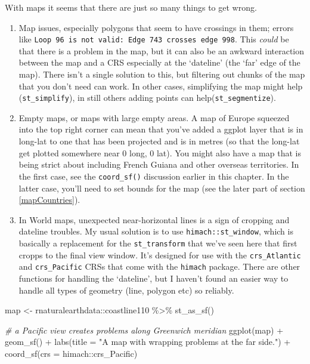 \documentclass[
]{book}
\newenvironment{Shaded}{\begin{snugshade}}{\end{snugshade}}
\newcommand{\AttributeTok}[1]{\textcolor[rgb]{0.77,0.63,0.00}{#1}}
\newcommand{\CommentTok}[1]{\textcolor[rgb]{0.56,0.35,0.01}{\textit{#1}}}
\newcommand{\FunctionTok}[1]{\textcolor[rgb]{0.00,0.00,0.00}{#1}}
\newcommand{\NormalTok}[1]{#1}
\newcommand{\OtherTok}[1]{\textcolor[rgb]{0.56,0.35,0.01}{#1}}
\newcommand{\SpecialCharTok}[1]{\textcolor[rgb]{0.00,0.00,0.00}{#1}}
\newcommand{\StringTok}[1]{\textcolor[rgb]{0.31,0.60,0.02}{#1}}
\providecommand{\tightlist}{%
  \setlength{\itemsep}{0pt}\setlength{\parskip}{0pt}}
\begin{document}
With maps it seems that there are just so many things to get wrong.

\begin{enumerate}
\def\labelenumi{\arabic{enumi})}
\tightlist
\item
  Map issues, especially polygons that seem to have crossings in them; errors like \texttt{Loop\ 96\ is\ not\ valid:\ Edge\ 743\ crosses\ edge\ 998}. This \emph{could} be that there is a problem in the map, but it can also be an awkward interaction between the map and a CRS especially at the `dateline' (the `far' edge of the map). There isn't a single solution to this, but filtering out chunks of the map that you don't need can work. In other cases, simplifying the map might help (\texttt{st\_simplify}), in still others adding points can help(\texttt{st\_segmentize}).
\item
  Empty maps, or maps with large empty areas. A map of Europe squeezed into the top right corner can mean that you've added a ggplot layer that is in long-lat to one that has been projected and is in metres (so that the long-lat get plotted somewhere near 0 long, 0 lat). You might also have a map that is being strict about including French Guiana and other overseas territories. In the first case, see the \texttt{coord\_sf()} discussion earlier in this chapter. In the latter case, you'll need to set bounds for the map (see the later part of section \ref{mapCountries}).
\item
  In World maps, unexpected near-horizontal lines is a sign of cropping and dateline troubles. My usual solution is to use \texttt{himach::st\_window}, which is basically a replacement for the \texttt{st\_transform} that we've seen here that first cropps to the final view window. It's designed for use with the \texttt{crs\_Atlantic} and \texttt{crs\_Pacific} CRSs that come with the \texttt{himach} package. There are other functions for handling the `dateline', but I haven't found an easier way to handle all types of geometry (line, polygon etc) so reliably.
\end{enumerate}

\begin{Shaded}
\begin{Highlighting}[]
\NormalTok{map }\OtherTok{\textless{}{-}}\NormalTok{ rnaturalearthdata}\SpecialCharTok{::}\NormalTok{coastline110 }\SpecialCharTok{\%\textgreater{}\%} 
  \FunctionTok{st\_as\_sf}\NormalTok{()}

\CommentTok{\# a Pacific view creates problems along Greenwich meridian}
\FunctionTok{ggplot}\NormalTok{(map) }\SpecialCharTok{+}
  \FunctionTok{geom\_sf}\NormalTok{() }\SpecialCharTok{+}
  \FunctionTok{labs}\NormalTok{(}\AttributeTok{title =} \StringTok{"A map with wrapping problems at the \textquotesingle{}far side\textquotesingle{}."}\NormalTok{) }\SpecialCharTok{+}
  \FunctionTok{coord\_sf}\NormalTok{(}\AttributeTok{crs =}\NormalTok{ himach}\SpecialCharTok{::}\NormalTok{crs\_Pacific)}
\end{Highlighting}
\end{Shaded}
\end{document}
